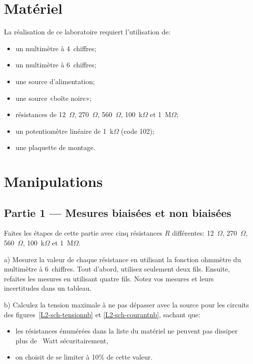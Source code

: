 \documentclass[canadien,12pt,oneside,letterpaper]{article}
\begin{document}
\section{Matériel}

\noindent La réalisation de ce laboratoire requiert l'utilisation de:
\vspace{1ex}
\begin{itemize} \itemsep4pt
\item un multimètre à 4\textonehalf~chiffres;
\item un multimètre à 6\textonehalf~chiffres;
\item une source d'alimentation;
\item une source «boîte noire»;
\item résistances de 12~$\Omega$, 270~$\Omega$, 560~$\Omega$, 100~k$\Omega$ et 1~M$\Omega$;
\item un potentiomètre linéaire de 1~k$\Omega$ (code 102);
\item une plaquette de montage.
\end{itemize}


\section{Manipulations}

\setlength{\parskip}{1ex plus 0.5ex minus 0.2ex}

\subsection{Partie 1 --- Mesures biaisées et non biaisées} \label{sec:part1}

Faites les étapes de cette partie avec cinq résistances $R$ différentes: 12~$\Omega$, 270~$\Omega$, 560~$\Omega$, 100~k$\Omega$ et 1~M$\Omega$.

a) Mesurez la valeur de chaque résistance en utilisant la fonction ohmmètre du multimètre à 6\textonehalf~chiffres. Tout d'abord, utilisez seulement deux fils. Ensuite, refaites les mesures en utilisant quatre fils. Notez vos mesures et leurs incertitudes dans un tableau.

b) Calculez la tension maximale à ne pas dépasser avec la source pour les circuits des figures~\ref{L2-sch-tensionnb} et \ref{L2-sch-courantnb}, sachant que: 
    \begin{itemize}
    \item les résistances énumérées dans la liste du matériel ne peuvent pas dissiper plus de \textonequarter~Watt sécuritairement,  
    \item on choisit de se limiter à 10\% de cette valeur.
    \end{itemize}
\vspace{1ex}
\end{document}
